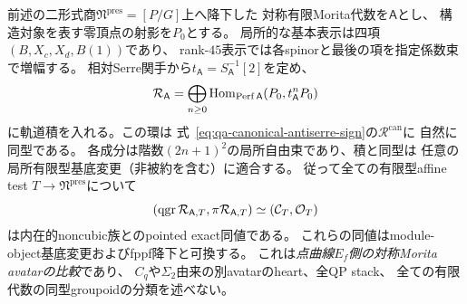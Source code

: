 \begin{theorem}
\label{thm:qa-symmetric-relative-pointed-heart}
前述の二形式商$\mathfrak N^{\mathrm{pres}}=[P/G]$上へ降下した
対称有限Morita代数を$\mathsf A$とし、
構造対象を表す零頂点の射影を$P_0$とする。
局所的な基本表示は四項$(B,X_c,X_d,B(1))$であり、
rank-$45$表示では各spinorと最後の項を指定係数束で増幅する。
相対Serre関手から$t_{\mathsf A}=S_{\mathsf A}^{-1}[2]$を定め、
\[
 \mathcal R_{\mathsf A}
 =\bigoplus_{n\ge0}
 \operatorname{Hom}_{\operatorname{Perf}\mathsf A}(P_0,t_{\mathsf A}^{n}P_0)
\]
に軌道積を入れる。この環は
式~\eqref{eq:qa-canonical-antiserre-sign}の$\mathcal R^{\mathrm{can}}$に
自然に同型である。
各成分は階数$(2n+1)^2$の局所自由束であり、積と同型は
任意の局所有限型基底変更（非被約を含む）に適合する。
従って全ての有限型affine test $T\to\mathfrak N^{\mathrm{pres}}$について
\[
 (\operatorname{qgr}\mathcal R_{\mathsf A,T},\pi\mathcal R_{\mathsf A,T})
 \simeq (\mathcal C_T,\mathcal O_T)
\]
は内在的noncubic族とのpointed exact同値である。
これらの同値はmodule-object基底変更およびfppf降下と可換する。
これは\emph{点曲線$E_f$側の対称Morita avatarの比較}であり、
$C_q$や$\Sigma_2$由来の別avatarのheart、全QP stack、
全ての有限代数の同型groupoidの分類を述べない。
\end{theorem}
